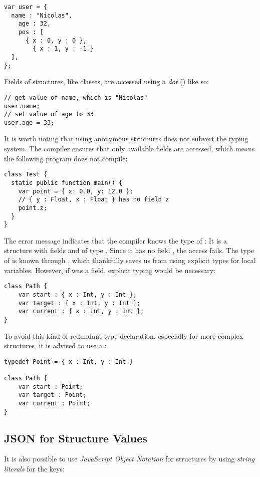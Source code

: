 \begin{lstlisting}
var user = {
  name : "Nicolas",
	age : 32,
	pos : [
	  { x : 0, y : 0 },
		{ x : 1, y : -1 }
  ],
};
\end{lstlisting}
Fields of structures, like classes, are accessed using a \emph{dot} () like so:

\begin{lstlisting}
// get value of name, which is "Nicolas"
user.name;
// set value of age to 33
user.age = 33;
\end{lstlisting}
It is worth noting that using anonymous structures does not subvert the typing system. The compiler ensures that only available fields are accessed, which means the following program does not compile:

\begin{lstlisting}
class Test {
  static public function main() {
    var point = { x: 0.0, y: 12.0 };
    // { y : Float, x : Float } has no field z
    point.z;
  }
}
\end{lstlisting}
The error message indicates that the compiler knows the type of : It is a structure with fields  and  of type . Since it has no field , the access fails.
The type of  is known through , which thankfully saves us from using explicit types for local variables. However, if  was a field, explicit typing would be necessary:

\begin{lstlisting}
class Path {
    var start : { x : Int, y : Int };
    var target : { x : Int, y : Int };
    var current : { x : Int, y : Int };
}
\end{lstlisting}
To avoid this kind of redundant type declaration, especially for more complex structures, it is advised to use a :

\begin{lstlisting}
typedef Point = { x : Int, y : Int }

class Path {
    var start : Point;
    var target : Point;
    var current : Point;
}
\end{lstlisting}


\subsection{JSON for Structure Values}
\label{types-structure-json}

It is also possible to use \emph{JavaScript Object Notation} for structures by using \emph{string literals} for the keys:

